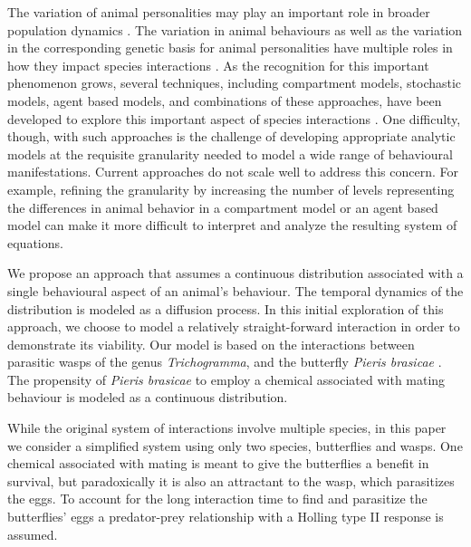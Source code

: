 \documentclass[review]{elsarticle}
\begin{document}
The variation of animal personalities may play an important role in broader population dynamics \cite{doi:10.1111/j.1461-0248.2010.01536.x}.  The variation in animal behaviours as well as the variation in the corresponding genetic basis for animal personalities have multiple roles in how they impact species interactions \cite{doi:10.1111/j.1461-0248.2010.01536.x,doi:10.1086/687235,mierzejewski_horn_luong_2019,SANTICCHIA20191,doi:10.1098/rspb.2014.1016,FARINE2015609,sibbald2009individual,kurvers2011effect,modlmeier2012diverse,doi:10.1037/0735-7036.107.3.250}.  As the recognition for this important phenomenon grows, several techniques,  including compartment models, stochastic
models, agent based models, and combinations of these
approaches, have been developed to explore this important aspect of species interactions  \cite{Keeling65,doi:10.1086/687235,doi:10.1098/rspb.2001.1599,SuperspreadingLloyd}.  One difficulty, though, with such approaches is the
challenge of developing appropriate analytic models at the requisite granularity needed to model a wide range of behavioural manifestations. Current approaches do not scale well to address this concern. For example, refining the granularity by increasing the number of levels representing the differences in animal behavior in a compartment model or an agent based model can make it more difficult to interpret and analyze the resulting system of equations. 

We propose an approach that assumes a continuous distribution
associated with a single behavioural aspect of an animal's behaviour. The temporal dynamics of the distribution is modeled as a diffusion process. In
this initial exploration of this approach, we choose to model a relatively
straight-forward interaction in order to demonstrate its viability. Our model is based on
the interactions between parasitic wasps of the genus
\textit{Trichogramma}, and the butterfly \textit{Pieris
  brasicae} \cite{10.1093/beheco/arq007}.  The propensity of
\textit{Pieris brasicae} to employ a chemical associated with mating
behaviour is modeled as a continuous distribution.

While the original system of interactions involve multiple species, in this paper we consider a simplified system using only two
species, butterflies and wasps.  One chemical associated with mating is meant to give the butterflies a benefit in survival, but paradoxically it is also an attractant to the wasp, which parasitizes the eggs. To account for the long interaction time to find and parasitize the butterflies' eggs a predator-prey relationship  with a Holling type II response \cite{TEWA20134825} is assumed.
\end{document}
